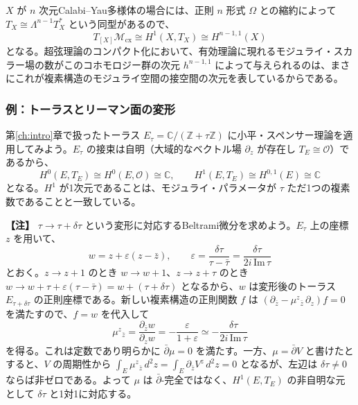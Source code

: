 \documentclass[uplatex, dvipdfmx, book]{jsbook}
\let\origsubsubsection\subsubsection
\renewcommand{\subsection}{\origsubsubsection}
\renewcommand{\subsubsection}{\paragraph}
\newenvironment{note}{\vspace{1ex}\par\footnotesize\noindent\textbf{【注】}}{\par\vspace{1ex}}
\begin{document}
$X$ が $n$ 次元Calabi--Yau多様体の場合には、正則 $n$ 形式 $\Omega$ との縮約によって $T_X \cong \Lambda^{n-1} T^*_X$ という同型があるので、
\begin{equation}
    T_{[X]} \mathcal{M}_{\text{cx}} \cong H^{1}(X, T_X) \cong H^{n-1, 1}(X)
\end{equation}
となる。超弦理論のコンパクト化において、有効理論に現れるモジュライ・スカラー場の数がこのコホモロジー群の次元 $h^{n-1,1}$ によって与えられるのは、まさにこれが複素構造のモジュライ空間の接空間の次元を表しているからである。

\subsection{例：トーラスとリーマン面の変形}

第\ref{ch:intro}章で扱ったトーラス $E_\tau = \mathbb{C}/(\mathbb{Z} + \tau\mathbb{Z})$ に小平・スペンサー理論を適用してみよう。$E_\tau$ の接束は自明（大域的なベクトル場 $\partial_z$ が存在し $T_E \cong \mathcal{O}$）であるから、
\begin{equation}
    H^0(E, T_E) \cong H^0(E, \mathcal{O}) \cong \mathbb{C}, \qquad H^1(E, T_E) \cong H^{0,1}(E) \cong \mathbb{C}
\end{equation}
となる。$H^1$ が1次元であることは、モジュライ・パラメータが $\tau$ ただ1つの複素数であることと一致している。

\begin{note}
$\tau \to \tau + \delta\tau$ という変形に対応するBeltrami微分を求めよう。$E_\tau$ 上の座標 $z$ を用いて、
\begin{equation}
    w = z + \varepsilon (z - \bar{z}), \qquad \varepsilon = \frac{\delta\tau}{\tau - \bar{\tau}} = \frac{\delta\tau}{2i\,\mathrm{Im}\,\tau}
\end{equation}
とおく。$z \to z + 1$ のとき $w \to w + 1$、$z \to z + \tau$ のとき $w \to w + \tau + \varepsilon(\tau - \bar{\tau}) = w + (\tau + \delta\tau)$ となるから、$w$ は変形後のトーラス $E_{\tau + \delta\tau}$ の正則座標である。新しい複素構造の正則関数 $f$ は $(\partial_{\bar z} - \mu^z{}_{\bar z}\,\partial_z) f = 0$ を満たすので、$f = w$ を代入して
\begin{equation}
    \mu^z{}_{\bar z} = \frac{\partial_{\bar z} w}{\partial_z w} = -\frac{\varepsilon}{1 + \varepsilon} \simeq -\frac{\delta\tau}{2i\,\mathrm{Im}\,\tau}
\end{equation}
を得る。これは定数であり明らかに $\bar\partial\mu = 0$ を満たす。一方、$\mu = \bar{\partial} V$ と書けたとすると、$V$ の周期性から $\int_E \mu^z{}_{\bar z}\, d^2z = \int_E \partial_{\bar z} V^z \, d^2 z = 0$ となるが、左辺は $\delta\tau \neq 0$ ならば非ゼロである。よって $\mu$ は $\bar\partial$-完全ではなく、$H^1(E, T_E)$ の非自明な元として $\delta\tau$ と1対1に対応する。
\end{note}
\end{document}
